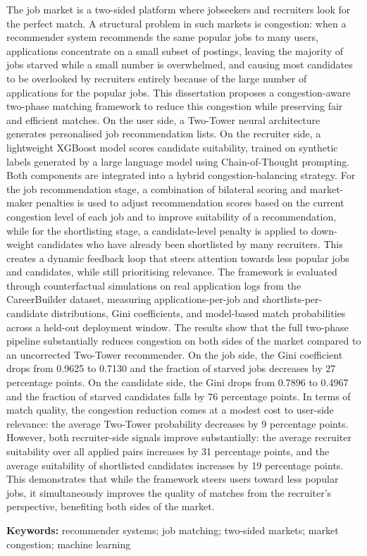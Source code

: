 The job market is a two-sided platform where jobseekers and recruiters
look for the perfect match. A structural problem in
such markets is congestion: when a recommender system recommends the same
popular jobs to many users, applications concentrate on a small subset
of postings, leaving the majority of jobs starved while a
small number is overwhelmed, and causing most candidates to be
overlooked by recruiters entirely because of the large number of applications for the popular jobs. This dissertation proposes a
congestion-aware two-phase matching framework to reduce this congestion while
preserving fair and efficient matches. On the user side, a Two-Tower
neural architecture generates personalised job recommendation lists. On
the recruiter side, a lightweight XGBoost model scores candidate
suitability, trained on synthetic labels generated by a large language
model using Chain-of-Thought prompting. Both components are integrated
into a hybrid congestion-balancing strategy. For the job recommendation stage, a combination of bilateral scoring and market-maker penalties is used to adjust recommendation scores based on the current congestion level of each job and to improve suitability of a recommendation, while for the shortlisting stage, a candidate-level penalty is applied to down-weight candidates who have already been shortlisted by many recruiters. This creates a dynamic feedback loop that steers attention towards less popular jobs and candidates, while still prioritising relevance. The framework is
evaluated through counterfactual simulations on real application logs
from the CareerBuilder dataset, measuring applications-per-job and
shortlists-per-candidate distributions, Gini coefficients, and
model-based match probabilities across a held-out deployment window.
The results show that the full two-phase pipeline substantially reduces congestion on both sides of the market compared to an uncorrected Two-Tower recommender. On the job side, the Gini coefficient drops from 0.9625 to 0.7130 and the fraction of starved jobs decreases by 27 percentage points. On the candidate side, the Gini drops from 0.7896 to 0.4967 and the fraction of starved candidates falls by 76 percentage points. In terms of match quality, the congestion reduction comes at a modest cost to user-side relevance: the average Two-Tower probability decreases by 9 percentage points. However, both recruiter-side signals improve substantially: the average recruiter suitability over all applied pairs increases by 31 percentage points, and the average suitability of shortlisted candidates increases by 19 percentage points. This demonstrates that while the framework steers users toward less popular jobs, it simultaneously improves the quality of matches from the recruiter's perspective, benefiting both sides of the market.

\textbf{Keywords:} recommender systems; job matching; two-sided markets; market congestion; machine learning
